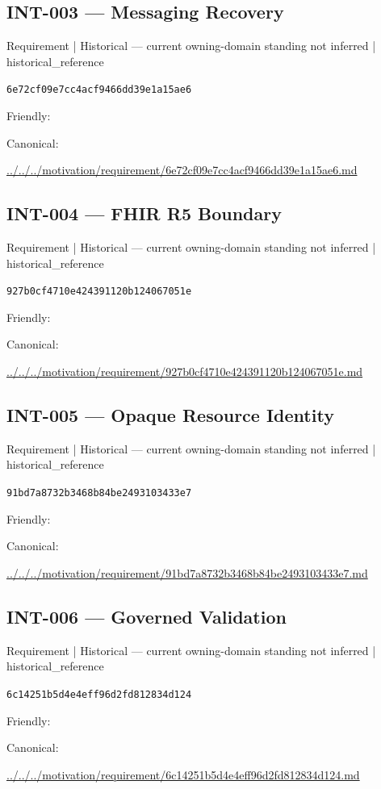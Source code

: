 \documentclass[10pt,a4paper]{article}
\begin{document}
\subsection*{INT-003 — Messaging Recovery}
{\small Requirement | Historical — current owning-domain standing not inferred | historical\_reference}\par
\texttt{6e72cf09e7cc4acf9466dd39e1a15ae6}\par
Friendly: \par
Canonical: \par
{\footnotesize\url{../../../motivation/requirement/6e72cf09e7cc4acf9466dd39e1a15ae6.md}}\par
\subsection*{INT-004 — FHIR R5 Boundary}
{\small Requirement | Historical — current owning-domain standing not inferred | historical\_reference}\par
\texttt{927b0cf4710e424391120b124067051e}\par
Friendly: \par
Canonical: \par
{\footnotesize\url{../../../motivation/requirement/927b0cf4710e424391120b124067051e.md}}\par
\subsection*{INT-005 — Opaque Resource Identity}
{\small Requirement | Historical — current owning-domain standing not inferred | historical\_reference}\par
\texttt{91bd7a8732b3468b84be2493103433e7}\par
Friendly: \par
Canonical: \par
{\footnotesize\url{../../../motivation/requirement/91bd7a8732b3468b84be2493103433e7.md}}\par
\subsection*{INT-006 — Governed Validation}
{\small Requirement | Historical — current owning-domain standing not inferred | historical\_reference}\par
\texttt{6c14251b5d4e4eff96d2fd812834d124}\par
Friendly: \par
Canonical: \par
{\footnotesize\url{../../../motivation/requirement/6c14251b5d4e4eff96d2fd812834d124.md}}\par
\end{document}
